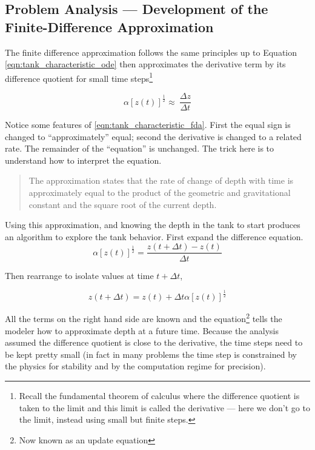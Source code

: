 \documentclass[12pt]{article}
\begin{document}
\subsection{Problem Analysis --- Development of the Finite-Difference Approximation}
The finite difference approximation follows the same principles up to Equation \ref{eqn:tank_characteristic_ode} then approximates the derivative term by its difference quotient for small time steps\footnote{Recall the fundamental theorem of calculus where the difference quotient is taken to the limit and this limit is called the derivative --- here we don't go to the limit, instead using small but finite steps.}

\begin{equation}
\alpha  [z(t)]^{\frac{1}{2}}\approx~  \frac{\Delta z}{\Delta t}
\label{eqn:tank_characteristic_fda}
\end{equation}

Notice some features of \ref{eqn:tank_characteristic_fda}.  First the equal sign is changed to ``approximately'' equal; second the derivative is changed to a related rate.  The remainder of the ``equation'' is unchanged.  The trick here is to understand how to interpret the equation. 
\begin{quote}
The approximation states that the rate of change of depth with time is approximately equal to the product of the geometric and gravitational constant and the square root of the current depth. 
\end{quote}

Using this approximation, and knowing the depth in the tank to start produces an algorithm to explore the tank behavior.  First expand the difference equation.
\begin{equation}
\alpha  [z(t)]^{\frac{1}{2}}= \frac{z(t+\Delta t) - z(t) }{\Delta t}
\label{eqn:tank_expanded_fda}
\end{equation}

Then rearrange to isolate values at time $t+\Delta t$,

\begin{equation}
{z(t+\Delta t) } = z(t) + \Delta t \alpha  [z(t)]^{\frac{1}{2}}
\label{eqn:tank_update}
\end{equation}

All the terms on the right hand side are known and the equation\footnote{Now known as an update equation} tells the modeler how to approximate depth at a future time.  Because the analysis assumed the difference quotient is close to the derivative, the time steps need to be kept pretty small (in fact in many problems the time step is constrained by the physics for stability and by the computation regime for precision).
\end{document}
